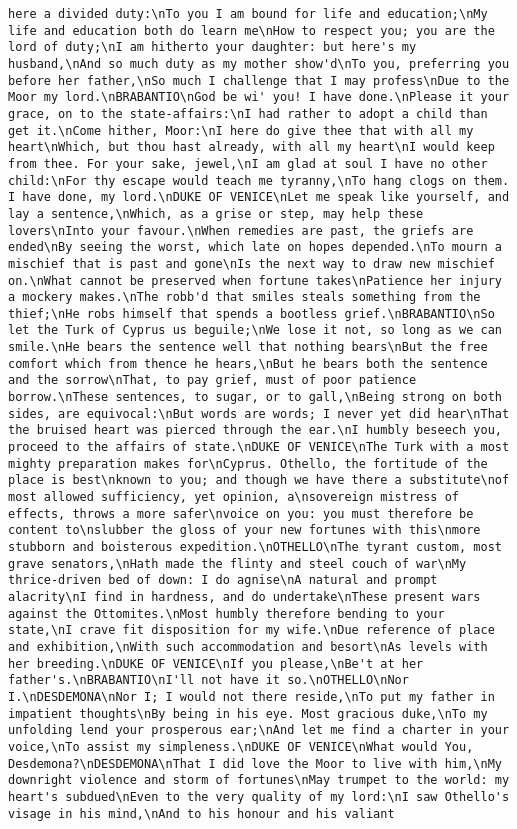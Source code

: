 \begin{verbatim}
here a divided duty:\nTo you I am bound for life and education;\nMy life and education both do learn me\nHow to respect you; you are the lord of duty;\nI am hitherto your daughter: but here's my husband,\nAnd so much duty as my mother show'd\nTo you, preferring you before her father,\nSo much I challenge that I may profess\nDue to the Moor my lord.\nBRABANTIO\nGod be wi' you! I have done.\nPlease it your grace, on to the state-affairs:\nI had rather to adopt a child than get it.\nCome hither, Moor:\nI here do give thee that with all my heart\nWhich, but thou hast already, with all my heart\nI would keep from thee. For your sake, jewel,\nI am glad at soul I have no other child:\nFor thy escape would teach me tyranny,\nTo hang clogs on them. I have done, my lord.\nDUKE OF VENICE\nLet me speak like yourself, and lay a sentence,\nWhich, as a grise or step, may help these lovers\nInto your favour.\nWhen remedies are past, the griefs are ended\nBy seeing the worst, which late on hopes depended.\nTo mourn a mischief that is past and gone\nIs the next way to draw new mischief on.\nWhat cannot be preserved when fortune takes\nPatience her injury a mockery makes.\nThe robb'd that smiles steals something from the thief;\nHe robs himself that spends a bootless grief.\nBRABANTIO\nSo let the Turk of Cyprus us beguile;\nWe lose it not, so long as we can smile.\nHe bears the sentence well that nothing bears\nBut the free comfort which from thence he hears,\nBut he bears both the sentence and the sorrow\nThat, to pay grief, must of poor patience borrow.\nThese sentences, to sugar, or to gall,\nBeing strong on both sides, are equivocal:\nBut words are words; I never yet did hear\nThat the bruised heart was pierced through the ear.\nI humbly beseech you, proceed to the affairs of state.\nDUKE OF VENICE\nThe Turk with a most mighty preparation makes for\nCyprus. Othello, the fortitude of the place is best\nknown to you; and though we have there a substitute\nof most allowed sufficiency, yet opinion, a\nsovereign mistress of effects, throws a more safer\nvoice on you: you must therefore be content to\nslubber the gloss of your new fortunes with this\nmore stubborn and boisterous expedition.\nOTHELLO\nThe tyrant custom, most grave senators,\nHath made the flinty and steel couch of war\nMy thrice-driven bed of down: I do agnise\nA natural and prompt alacrity\nI find in hardness, and do undertake\nThese present wars against the Ottomites.\nMost humbly therefore bending to your state,\nI crave fit disposition for my wife.\nDue reference of place and exhibition,\nWith such accommodation and besort\nAs levels with her breeding.\nDUKE OF VENICE\nIf you please,\nBe't at her father's.\nBRABANTIO\nI'll not have it so.\nOTHELLO\nNor I.\nDESDEMONA\nNor I; I would not there reside,\nTo put my father in impatient thoughts\nBy being in his eye. Most gracious duke,\nTo my unfolding lend your prosperous ear;\nAnd let me find a charter in your voice,\nTo assist my simpleness.\nDUKE OF VENICE\nWhat would You, Desdemona?\nDESDEMONA\nThat I did love the Moor to live with him,\nMy downright violence and storm of fortunes\nMay trumpet to the world: my heart's subdued\nEven to the very quality of my lord:\nI saw Othello's visage in his mind,\nAnd to his honour and his valiant 
\end{verbatim}
